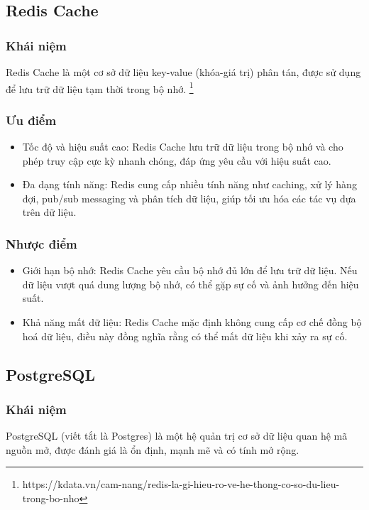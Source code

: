 \subsection{Redis Cache}
\subsubsection{Khái niệm}
\indent Redis Cache là một cơ sở dữ liệu key-value (khóa-giá trị) phân tán, được sử dụng để lưu trữ dữ liệu tạm thời trong bộ nhớ. \footnote{https://kdata.vn/cam-nang/redis-la-gi-hieu-ro-ve-he-thong-co-so-du-lieu-trong-bo-nho}
\subsubsection{Ưu điểm}
\begin{itemize}
    \item Tốc độ và hiệu suất cao: Redis Cache lưu trữ dữ liệu trong bộ nhớ và cho phép truy cập cực kỳ nhanh chóng, đáp ứng yêu cầu với hiệu suất cao.
    \item Đa dạng tính năng: Redis cung cấp nhiều tính năng như caching, xử lý hàng đợi, pub/sub messaging và phân tích dữ liệu, giúp tối ưu hóa các tác vụ dựa trên dữ liệu.
\end{itemize}
\subsubsection{Nhược điểm}
\begin{itemize}
    \item Giới hạn bộ nhớ: Redis Cache yêu cầu bộ nhớ đủ lớn để lưu trữ dữ liệu. Nếu dữ liệu vượt quá dung lượng bộ nhớ, có thể gặp sự cố và ảnh hưởng đến hiệu suất.
    \item Khả năng mất dữ liệu: Redis Cache mặc định không cung cấp cơ chế đồng bộ hoá dữ liệu, điều này đồng nghĩa rằng có thể mất dữ liệu khi xảy ra sự cố.
\end{itemize}
\subsection{PostgreSQL}
\subsubsection{Khái niệm}
\indent PostgreSQL (viết tắt là Postgres) là một hệ quản trị cơ sở dữ liệu quan hệ mã nguồn mở, được đánh giá là ổn định, mạnh mẽ và có tính mở rộng.
